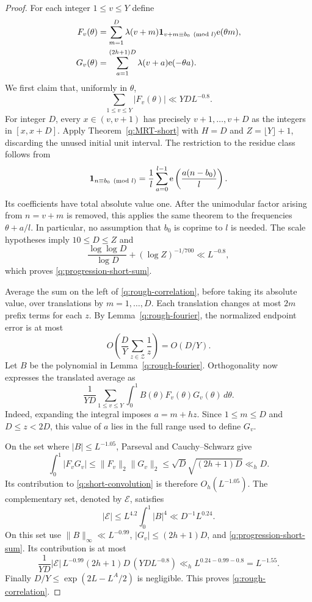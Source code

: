 \begin{proof}
For each integer $1\le v\le Y$ define
\begin{align*}
 F_v(\theta)&=\sum_{m=1}^D
  \lambda(v+m)\mathbf 1_{v+m\equiv b_0\pmod l}\mathrm e(\theta m),\\
 G_v(\theta)&=\sum_{a=1}^{(2h+1)D}
  \lambda(v+a)\mathrm e(-\theta a).
\end{align*}
We first claim that, uniformly in $\theta$,
\begin{equation}\label{q:progression-short-sum}
 \sum_{1\le v\le Y}|F_v(\theta)|\ll YD L^{-0.8}.
\end{equation}
For integer $D$, every $x\in(v,v+1)$ has precisely
$v+1,\ldots,v+D$ as the integers in $[x,x+D]$.
Apply Theorem~\ref{q:MRT-short} with $H=D$ and
$Z=\lfloor Y\rfloor+1$, discarding the unused initial unit interval.
The restriction to the residue class follows from
\[
 \mathbf 1_{n\equiv b_0\pmod l}
   =\frac1l\sum_{a=0}^{l-1}\mathrm e\left(\frac{a(n-b_0)}l\right).
\]
Its coefficients have total absolute value one. After the unimodular
factor arising from $n=v+m$ is removed, this applies the same theorem to
the frequencies $\theta+a/l$. In particular, no assumption that $b_0$ is
coprime to $l$ is needed. The scale hypotheses imply $10\le D\le Z$ and
\[
 \frac{\log\log D}{\log D}+(\log Z)^{-1/700}
 \ll L^{-0.8},
\]
which proves \eqref{q:progression-short-sum}.

Average the sum on the left of \eqref{q:rough-correlation}, before taking
its absolute value, over translations by $m=1,\ldots,D$. Each translation
changes at most $2m$ prefix terms for each $z$. By
Lemma~\ref{q:rough-fourier}, the normalized endpoint error is at most
\[
 O\left(\frac D Y\sum_{z\in\mathcal Z}\frac1z\right)=O(D/Y).
\]
Let $B$ be the polynomial in Lemma~\ref{q:rough-fourier}. Orthogonality now
expresses the translated average as
\begin{equation}\label{q:short-convolution}
 \frac1{YD}\sum_{1\le v\le Y}
   \int_0^1B(\theta)F_v(\theta)G_v(\theta)\,d\theta.
\end{equation}
Indeed, expanding the integral imposes $a=m+hz$. Since
$1\le m\le D$ and $D\le z<2D$, this value of $a$ lies in the full range
used to define $G_v$.

On the set where $|B|\le L^{-1.05}$, Parseval and Cauchy--Schwarz give
\[
 \int_0^1|F_vG_v|\le\|F_v\|_2\|G_v\|_2
 \le\sqrt{D}\sqrt{(2h+1)D}\ll_h D.
\]
Its contribution to \eqref{q:short-convolution} is therefore
$O_h(L^{-1.05})$. The complementary set, denoted by $\mathcal E$, satisfies
\[
 |\mathcal E|\le L^{4.2}\int_0^1|B|^4
 \ll D^{-1}L^{0.24}.
\]
On this set use $\|B\|_\infty\ll L^{-0.99}$,
$|G_v|\le(2h+1)D$, and \eqref{q:progression-short-sum}. Its contribution is
at most
\[
 \frac1{YD}|\mathcal E|\,L^{-0.99}(2h+1)D\,(YDL^{-0.8})
 \ll_h L^{0.24-0.99-0.8}=L^{-1.55}.
\]
Finally $D/Y\le\exp(2L-L^A/2)$ is negligible. This proves
\eqref{q:rough-correlation}.
\end{proof}

